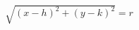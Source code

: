 \documentclass[preview]{standalone}
\begin{document}
\begin{align*}
\sqrt{(x-h)^2 + (y-k)^2} = r
\end{align*}
\end{document}

